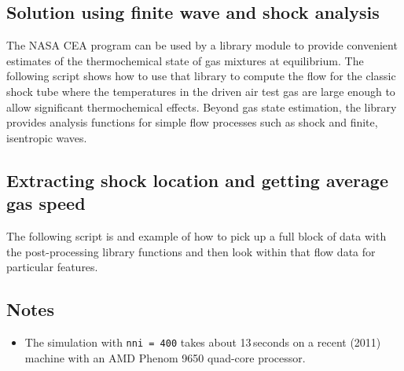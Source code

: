 \noindent
\topbar

\bottombar

\noindent
\topbar

\bottombar

\newpage
\subsection{Solution using finite wave and shock analysis}
\label{finite-wave-sec}
%
The NASA CEA program can be used by a library module to provide convenient estimates 
of the thermochemical state of gas mixtures at equilibrium.
The following script shows how to use that library to compute the flow for the classic
shock tube where the temperatures in the driven air test gas are large enough to 
allow significant thermochemical effects.
Beyond gas state estimation, the library provides analysis functions for simple 
flow processes such as shock and finite, isentropic waves.

\noindent
\topbar

\bottombar

\newpage
\subsection{Extracting shock location and getting average gas speed}
%
The following script is and example of how to pick up a full block of data
with the post-processing library functions and then look within that flow data
for particular features.

\noindent
\topbar

\bottombar

\subsection{Notes}
\begin{itemize}
\item The simulation with \texttt{nni = 400} takes about 13\,seconds on a recent (2011) machine 
  with an AMD Phenom 9650 quad-core processor.
\end{itemize}
